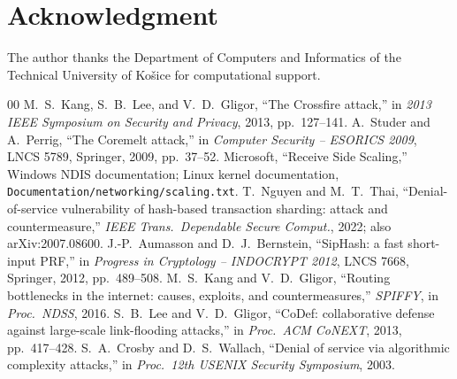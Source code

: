 \documentclass[conference]{IEEEtran}
\begin{document}
\section*{Acknowledgment}

The author thanks the Department of Computers and Informatics of the Technical University of Ko\v{s}ice for
computational support.

\begin{thebibliography}{00}
 M.~S.~Kang, S.~B.~Lee, and V.~D.~Gligor, ``The Crossfire attack,'' in \emph{2013 IEEE
Symposium on Security and Privacy}, 2013, pp.~127--141.
 A.~Studer and A.~Perrig, ``The Coremelt attack,'' in \emph{Computer Security -- ESORICS 2009},
LNCS 5789, Springer, 2009, pp.~37--52.
 Microsoft, ``Receive Side Scaling,'' Windows NDIS documentation; Linux kernel documentation,
\texttt{Documentation/networking/scaling.txt}.
 T.~Nguyen and M.~T.~Thai, ``Denial-of-service vulnerability of hash-based transaction
sharding: attack and countermeasure,'' \emph{IEEE Trans.\ Dependable Secure Comput.}, 2022; also
arXiv:2007.08600.
 J.-P.~Aumasson and D.~J.~Bernstein, ``SipHash: a fast short-input PRF,'' in \emph{Progress in
Cryptology -- INDOCRYPT 2012}, LNCS 7668, Springer, 2012, pp.~489--508.
 M.~S.~Kang and V.~D.~Gligor, ``Routing bottlenecks in the internet: causes, exploits, and
countermeasures,'' \emph{SPIFFY}, in \emph{Proc.\ NDSS}, 2016.
 S.~B.~Lee and V.~D.~Gligor, ``CoDef: collaborative defense against large-scale link-flooding
attacks,'' in \emph{Proc.\ ACM CoNEXT}, 2013, pp.~417--428.
 S.~A.~Crosby and D.~S.~Wallach, ``Denial of service via algorithmic complexity attacks,''
in \emph{Proc.\ 12th USENIX Security Symposium}, 2003.
\end{thebibliography}
\end{document}
